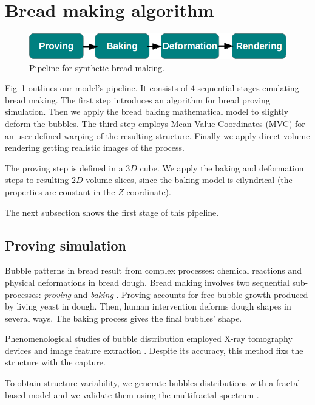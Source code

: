 \documentclass[final,5p,times]{elsarticle}
\begin{document}
\section{Bread making algorithm}

\begin{figure}
\includegraphics[scale=0.45]{pipeline.png}
\caption{Pipeline for synthetic bread making.}
\label{FigPipeline}
\end{figure}

Fig~\ref{FigPipeline} outlines our model's  pipeline. It consists of $4$ sequential stages emulating bread making. The first step introduces an algorithm for bread proving simulation. Then we apply the bread baking mathematical model \cite{Powathil2004} to slightly deform the bubbles. The third step employs Mean Value Coordinates (MVC) \cite{Floater2003} for an user defined warping of the resulting structure. Finally we apply direct volume rendering getting realistic images of the process.

The proving step is defined in a $3D$ cube. We apply the baking and deformation steps to resulting $2D$ volume slices, since the baking model is cilyndrical (the properties are constant in the $Z$ coordinate).


The next subsection shows the first stage of this pipeline.

\subsection{Proving simulation}
\label{breadprov}
Bubble patterns in bread result from complex processes: chemical reactions and physical deformations in bread dough. Bread making involves two sequential sub-processes: {\em proving} \cite{Babin2006} and {\em baking} \cite{Mondal2008}. Proving accounts for free bubble growth produced by living yeast in dough. Then, human intervention deforms dough shapes in several ways. The baking process gives the final bubbles' shape.

Phenomenological studies of bubble distribution employed X-ray tomography devices and image feature extraction \cite{Babin2006, VanDyck2014,  Gonzales2008}. Despite its accuracy, this method fixs the structure with the capture.

To obtain structure variability, we generate bubbles distributions with a fractal-based model \cite{Mandelbrot1982} and we validate them using the multifractal spectrum \cite{Xu2009}.
\end{document}

